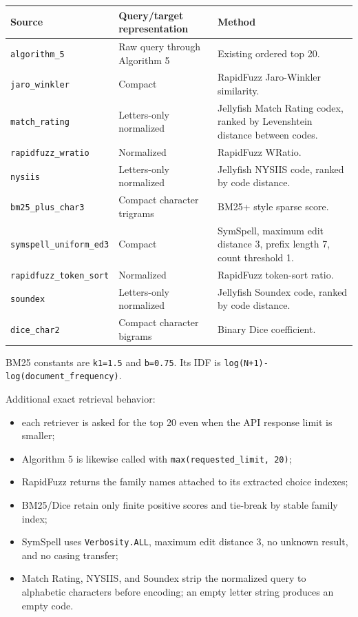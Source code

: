 {\def\LTcaptype{none} %
\begin{longtable}[]{@{}>{\RaggedRight\arraybackslash}p{.22\linewidth}>{\RaggedRight\arraybackslash}p{.34\linewidth}>{\RaggedRight\arraybackslash}p{.36\linewidth}@{}}
\toprule\noalign{}
Source & Query/target representation & Method \\
\midrule\noalign{}
\endhead
\bottomrule\noalign{}
\endlastfoot
\texttt{algorithm\_\allowbreak{}5} & Raw query through Algorithm 5 & Existing ordered top 20. \\
\texttt{jaro\_\allowbreak{}winkler} & Compact & RapidFuzz Jaro-Winkler similarity. \\
\texttt{match\_\allowbreak{}rating} & Letters-only normalized & Jellyfish Match Rating codex, ranked by Levenshtein distance between codes. \\
\texttt{rapidfuzz\_\allowbreak{}wratio} & Normalized & RapidFuzz WRatio. \\
\texttt{nysiis} & Letters-only normalized & Jellyfish NYSIIS code, ranked by code distance. \\
\texttt{bm25\_\allowbreak{}plus\_\allowbreak{}char3} & Compact character trigrams & BM25+ style sparse score. \\
\texttt{symspell\_\allowbreak{}uniform\_\allowbreak{}ed3} & Compact & SymSpell, maximum edit distance 3, prefix length 7, count threshold 1. \\
\texttt{rapidfuzz\_\allowbreak{}token\_\allowbreak{}sort} & Normalized & RapidFuzz token-sort ratio. \\
\texttt{soundex} & Letters-only normalized & Jellyfish Soundex code, ranked by code distance. \\
\texttt{dice\_\allowbreak{}char2} & Compact character bigrams & Binary Dice coefficient. \\
\end{longtable}
}

BM25 constants are \texttt{k1=1.5} and \texttt{b=0.75}. Its IDF is \texttt{log(N+1)-log(document\_\allowbreak{}frequency)}.

Additional exact retrieval behavior:

\begin{itemize}
\tightlist
\item
  each retriever is asked for the top 20 even when the API response limit is smaller;
\item
  Algorithm 5 is likewise called with \texttt{max(requested\_\allowbreak{}limit,\ 20)};
\item
  RapidFuzz returns the family names attached to its extracted choice indexes;
\item
  BM25/Dice retain only finite positive scores and tie-break by stable family index;
\item
  SymSpell uses \texttt{Verbosity.ALL}, maximum edit distance 3, no unknown result, and no casing transfer;
\item
  Match Rating, NYSIIS, and Soundex strip the normalized query to alphabetic characters before encoding; an empty letter string produces an empty code.
\end{itemize}

